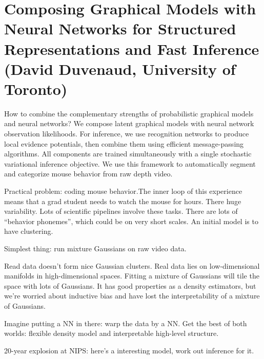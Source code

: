 \section{Composing Graphical Models with Neural Networks for Structured Representations and Fast Inference (David Duvenaud, University of Toronto)}

How to combine the complementary strengths of probabilistic graphical models and neural networks? We compose latent graphical models with neural network observation likelihoods. For inference, we use recognition networks to produce local evidence potentials, then combine them using efficient message-passing algorithms. All components are trained simultaneously with a single stochastic variational inference objective. We use this framework to automatically segment and categorize mouse behavior from raw depth video.

Practical problem: coding mouse behavior.The inner loop of this experience means that a grad student needs to watch the mouse for hours. There huge variability. Lots of scientific pipelines involve these tasks. There are lots of ``behavior phonemes'', which could be on very short scales. An initial model is to have clustering. 

Simplest thing: run mixture Gaussians on raw video data.

Read data doesn't form nice Gaussian clusters. Real data lies on low-dimensional manifolds in high-dimensional spaces. Fitting a mixture of Gaussians will tile the space with lots of Gaussians. It has good properties as a density estimators, but we're worried about inductive bias and have lost the interpretability of a mixture of Gaussians. 

Imagine putting a NN in there: warp the data by a NN. Get the best of both worlds: flexible density model and interpretable high-level structure. 

20-year explosion at NIPS: here's a interesting model, work out inference for it.

